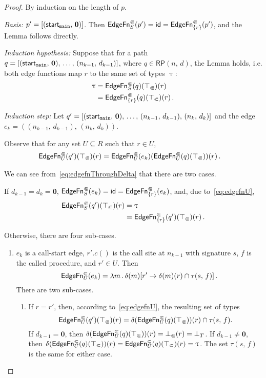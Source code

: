 \begin{proof}
  By induction on the length of $p$.
  
  \textit{Basis:} $p'=[(\textsf{start}_\texttt{main},\,\mathbf0)]$. Then $\textsf{EdgeFn}^\Subset_{S}(p')=\textsf{id}=\textsf{EdgeFn}^\Subset_{\{r\}}(p')$, and the Lemma follows directly.
  
  \textit{Induction hypothesis:} Suppose that for a path $q=[(\textsf{start}_\texttt{main},\,\mathbf0),\,\dots,\,(n_{k-1},\,d_{k-1})]$, where $q\in\textsf{RP}(n,\,d)$, the Lemma holds, i.e. both edge functions map $r$ to the same set of types $\uptau$:
  \begin{align*}
    \uptau
    &=\textsf{EdgeFn}^\Subset_{S}(q)(\top_\Subset)(r)\\
    &=\textsf{EdgeFn}^\Subset_{\{r\}}(q)(\top_\Subset)(r)\,.
  \end{align*}
  
  \textit{Induction step:} Let $q'=[(\textsf{start}_\texttt{main},\,\mathbf0),\,\dots,\,(n_{k-1},\,d_{k-1}),\,(n_k,\,d_k)]$ and the edge $e_k=((n_{k-1},\,d_{k-1}),\,(n_k,\,d_k))$.
  
  Observe that for any set $U\subseteq R$ such that $r\in U$,
  \begin{align}\label{eq:edgefnU}
    \textsf{EdgeFn}^\Subset_{U}(q')(\top_\Subset)(r)
    &=\textsf{EdgeFn}^\Subset_{U}(e_k)(\textsf{EdgeFn}^\Subset_{U}(q)(\top_\Subset))(r)\,.
  \end{align}
  
  We can see from~\eqref{eq:edgefnThroughDelta} that there are two cases.  
  
  If $d_{k-1}=d_k=\mathbf0$, $\textsf{EdgeFn}^\Subset_{S}(e_k)=\textsf{id}=\textsf{EdgeFn}^\Subset_{\{r\}}(e_k)$, and, due to~\eqref{eq:edgefnU},
  \begin{align*}
    \textsf{EdgeFn}^\Subset_{S}(q')(\top_\Subset)(r)&=\uptau\\
    &=\textsf{EdgeFn}^\Subset_{\{r\}}(q')(\top_\Subset)(r)\,.
  \end{align*}
  
  Otherwise, there are four sub-cases.
  \begin{enumerate}
    \item $e_k$ is a call-start edge, $r'.c()$ is the call site at $n_{k-1}$ with signature $s$, $f$ is the called procedure, and $r'\in U$.
    Then
    \[
      \textsf{EdgeFn}^\Subset_{U}(e_k)=\lambda m\,.\,\delta(m)[r'\to\delta(m)(r)\cap\tau(s,\,f)]\,.
    \]
    There are two sub-cases.
    \begin{enumerate}
      \item\label{item:callstartreceq} If $r=r'$, then, according to~\eqref{eq:edgefnU}, the resulting set of types 
        \[
          \textsf{EdgeFn}^\Subset_{U}(q')(\top_\Subset)(r)=\delta(\textsf{EdgeFn}^\Subset_{U}(q)(\top_\Subset))(r)\cap\tau(s,\,f).
        \]
        If $d_{k-1}=\mathbf0$, then $\delta(\textsf{EdgeFn}^\Subset_{U}(q)(\top_\Subset))(r)=\bot_\Subset(r)=\bot_T$. If $d_{k-1}\ne\mathbf0$, then $\delta(\textsf{EdgeFn}^\Subset_{U}(q)(\top_\Subset))(r)=\textsf{EdgeFn}^\Subset_{U}(q)(\top_\Subset)(r)=\uptau$. The set $\tau(s,\,f)$ is the same for either case.
    

\end{enumerate}
\end{enumerate}
\end{proof}
